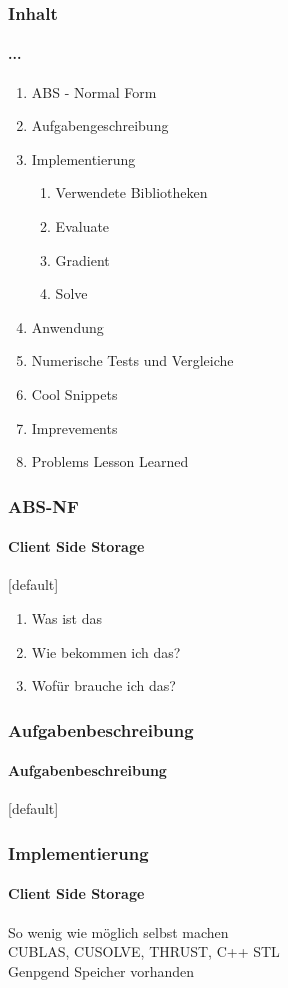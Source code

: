 \begin{frame}
\frametitle{Inhalt}
\framesubtitle{...}
	\begin{enumerate}
		\item ABS - Normal Form
		\item Aufgabengeschreibung
		\item Implementierung
		\begin{enumerate}
			\item Verwendete Bibliotheken
			\item Evaluate
			\item Gradient
			\item Solve
		\end{enumerate}
		\item Anwendung
		\item Numerische Tests und Vergleiche
		\item Cool Snippets
		\item Imprevements
		\item Problems Lesson Learned
	\end{enumerate}
\end{frame}
\begin{frame}
\frametitle{ABS-NF}
\framesubtitle{Client Side Storage}
	[default]
	\begin{enumerate}
		\item Was ist das
		\item Wie bekommen ich das?
		\item Wofür brauche ich das?
	\end{enumerate}	
\end{frame}
\begin{frame}
\frametitle{Aufgabenbeschreibung}
\framesubtitle{Aufgabenbeschreibung}
[default]

\end{frame}
\begin{frame}
\frametitle{Implementierung}
\framesubtitle{Client Side Storage}
 So wenig wie möglich selbst machen \\
 CUBLAS, CUSOLVE, THRUST, C++ STL \\
 Genpgend Speicher vorhanden
\end{frame}
